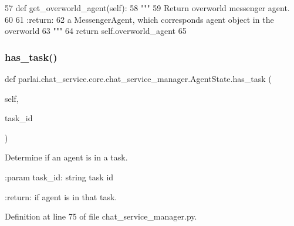 \begin{DoxyCode}
57     \textcolor{keyword}{def }get\_overworld\_agent(self):
58         \textcolor{stringliteral}{"""}
59 \textcolor{stringliteral}{        Return overworld messenger agent.}
60 \textcolor{stringliteral}{}
61 \textcolor{stringliteral}{        :return:}
62 \textcolor{stringliteral}{            a MessengerAgent, which corresponds agent object in the overworld}
63 \textcolor{stringliteral}{        """}
64         \textcolor{keywordflow}{return} self.overworld\_agent
65 
\end{DoxyCode}
\mbox{\label{classparlai_1_1chat__service_1_1core_1_1chat__service__manager_1_1AgentState_abdf5c5efdb7b58145197c579350920c2}} 
\subsubsection{\texorpdfstring{has\+\_\+task()}{has\_task()}}
{\footnotesize\ttfamily def parlai.\+chat\+\_\+service.\+core.\+chat\+\_\+service\+\_\+manager.\+Agent\+State.\+has\+\_\+task (\begin{DoxyParamCaption}\item[{}]{self,  }\item[{}]{task\+\_\+id }\end{DoxyParamCaption})}

\begin{DoxyVerb}Determine if an agent is in a task.

:param task_id:
    string task id

:return:
    if agent is in that task.
\end{DoxyVerb}
 

Definition at line 75 of file chat\+\_\+service\+\_\+manager.\+py.


